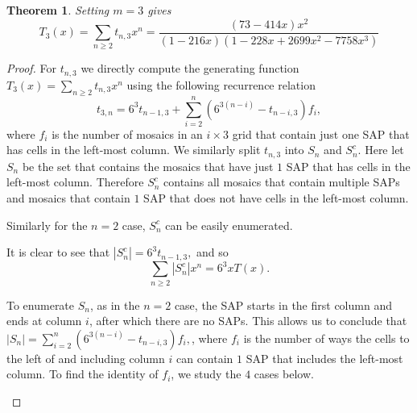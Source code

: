 \documentclass[12pt]{article}
\newtheorem{theorem}{Theorem}
\theoremstyle{plain}
\theoremstyle{definition}
\theoremstyle{remark}
\theoremstyle{definition}
\newcommand{\cellopen}[4]{ \draw[thick] ( #1 , #2 ) rectangle ( #3 , #4 ); \node[shape=circle,draw=red,fill=red, inner sep=0pt,minimum size=3pt] (A) at ( #1 * 0.5 + #3 * 0.5 , #2 * 0.5 + #4 * 0.5 ){};}
\newcommand{\cellA}[4]{\draw[red, thick, densely dotted] ( #1 + 0.5 , #2 ) arc(0:90:{0.5}); \draw[thick] ( #1 , #2 ) rectangle ( #3 , #4 );}
\newcommand{\cellD}[4]{\draw[red, thick, densely dotted] ( #1 , #2 + 0.5 ) arc(-90:0:{0.5}); \draw[thick] ( #1 , #2 ) rectangle ( #3 , #4 );}
\begin{document}
\begin{theorem}\label{thm: m=3 case}
Setting $m=3$ gives
\begin{equation}
    T_3(x) = \sum_{n \geq 2}t_{n,3}x^n = \frac{(73-414x)x^2}{(1-216x)(1-228x+2699x^2-7758x^3)}
\end{equation}
\end{theorem}

\begin{proof}
For $t_{n,3}$ we directly compute the generating function $T_3(x)=\sum_{n \geq 2}t_{n,3}x^n$ using the following recurrence relation
$$t_{3,n} = 6^3 t_{n-1,3} + \sum_{i = 2}^{n}(6^{3(n-i)} - t_{n-i,3})f_{i},$$
where $f_{i}$ is the number of mosaics in an $i \times 3$ grid  that contain just one SAP that has cells in the left-most column. We similarly split $t_{n,3}$ into $S_n$ and $S_n^c$. Here let $S_n$ be the set that contains the mosaics that have just $1$ SAP that has cells in the left-most column. Therefore $S_n^c$ contains all mosaics that contain multiple SAPs and mosaics that contain $1$ SAP that does not have cells in the left-most column. 

Similarly for the $n=2$ case, $S_n^c$ can be easily enumerated. 
\begin{center}
    \label{fig: Sc breakdown for 3}
\end{center}

It is clear to see that $|S_n^c| = 6^3 t_{n-1,3},$ and so 
$$\sum_{n \geq 2} |S_n^c|x^n = 6^3 xT(x).$$

To enumerate $S_n$, as in the $n=2$ case, the SAP starts in the first column and ends at column $i$, after which there are no SAPs. This allows us to conclude that $|S_n| = \sum_{i = 2}^{n}(6^{3(n-i)} - t_{n-i,3})f_{i},$, where $f_i$ is the number of ways the cells to the left of and including column $i$ can contain $1$ SAP that includes the left-most column. To find the identity of $f_i$, we study the $4$ cases below.

\begin{center}
\end{center}
\end{proof}
\end{document}
